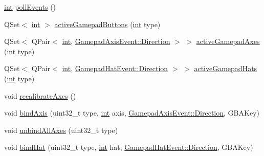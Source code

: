 \begin{DoxyCompactItemize}
\item 
\mbox{\hyperlink{ioapi_8h_a787fa3cf048117ba7123753c1e74fcd6}{int}} \mbox{\hyperlink{class_q_g_b_a_1_1_input_controller_a6bef594195d44a24fff69b4fd8aaeef1}{poll\+Events}} ()
\item 
Q\+Set$<$ \mbox{\hyperlink{ioapi_8h_a787fa3cf048117ba7123753c1e74fcd6}{int}} $>$ \mbox{\hyperlink{class_q_g_b_a_1_1_input_controller_af63517975e1ed30b033474060da4d9b1}{active\+Gamepad\+Buttons}} (\mbox{\hyperlink{ioapi_8h_a787fa3cf048117ba7123753c1e74fcd6}{int}} type)
\item 
Q\+Set$<$ Q\+Pair$<$ \mbox{\hyperlink{ioapi_8h_a787fa3cf048117ba7123753c1e74fcd6}{int}}, \mbox{\hyperlink{class_q_g_b_a_1_1_gamepad_axis_event_a5d50ab74dce4e58252f2affb5f227bbc}{Gamepad\+Axis\+Event\+::\+Direction}} $>$ $>$ \mbox{\hyperlink{class_q_g_b_a_1_1_input_controller_a05dfd816f7f197068514b2065bbefef9}{active\+Gamepad\+Axes}} (\mbox{\hyperlink{ioapi_8h_a787fa3cf048117ba7123753c1e74fcd6}{int}} type)
\item 
Q\+Set$<$ Q\+Pair$<$ \mbox{\hyperlink{ioapi_8h_a787fa3cf048117ba7123753c1e74fcd6}{int}}, \mbox{\hyperlink{class_q_g_b_a_1_1_gamepad_hat_event_ae3f20662c61b054e5344aafb9d843837}{Gamepad\+Hat\+Event\+::\+Direction}} $>$ $>$ \mbox{\hyperlink{class_q_g_b_a_1_1_input_controller_ae9df370f0ec15e1246859fd24e5da0ee}{active\+Gamepad\+Hats}} (\mbox{\hyperlink{ioapi_8h_a787fa3cf048117ba7123753c1e74fcd6}{int}} type)
\item 
void \mbox{\hyperlink{class_q_g_b_a_1_1_input_controller_af7d2e32ac417a33b5eed9bf861d5b54f}{recalibrate\+Axes}} ()
\item 
void \mbox{\hyperlink{class_q_g_b_a_1_1_input_controller_a3d393ba04e9b5671104d93dad40f495b}{bind\+Axis}} (uint32\+\_\+t type, \mbox{\hyperlink{ioapi_8h_a787fa3cf048117ba7123753c1e74fcd6}{int}} axis, \mbox{\hyperlink{class_q_g_b_a_1_1_gamepad_axis_event_a5d50ab74dce4e58252f2affb5f227bbc}{Gamepad\+Axis\+Event\+::\+Direction}}, G\+B\+A\+Key)
\item 
void \mbox{\hyperlink{class_q_g_b_a_1_1_input_controller_a2f6fe03cf89c5336efe121c65c95309e}{unbind\+All\+Axes}} (uint32\+\_\+t type)
\item 
void \mbox{\hyperlink{class_q_g_b_a_1_1_input_controller_a213ad91873af6067f50e5581e1d9b46c}{bind\+Hat}} (uint32\+\_\+t type, \mbox{\hyperlink{ioapi_8h_a787fa3cf048117ba7123753c1e74fcd6}{int}} hat, \mbox{\hyperlink{class_q_g_b_a_1_1_gamepad_hat_event_ae3f20662c61b054e5344aafb9d843837}{Gamepad\+Hat\+Event\+::\+Direction}}, G\+B\+A\+Key)
\item 

\end{DoxyCompactItemize}
